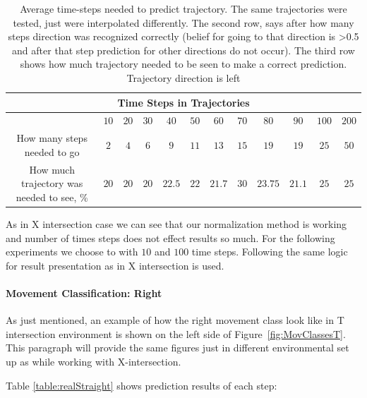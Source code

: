 \begin{table}[h!]
	\centering
	\begin{tabular}{|c|c|c|c|c|c|c|c|c|c|c|c|} 
		\hline
		\multicolumn{12}{|c|}{Time Steps in Trajectories} \\
		\hline
		& $10$ & $20$ & $30$ & $40$ & $50$ & $60$ & $70$ & $80$ & $90$ & $100$ & $200$ \\ [0.5ex] 
		\hline\hline
		How many steps needed to go               & $2$  & $4$  & $6$  & $9$     & $11$ & $13$  &  $15$   & $19$     & $19$   & $25$ & $50$ \\ [1ex]
		How much trajectory was needed to see, \% & $20$ & $20$ & $20$ & $22.5$  & $22$ & $21.7$ & $30$ & $23.75$  & $21.1$ & $25$ & $25$ \\ [1ex]
		\hline
	\end{tabular}
	\caption{Average time-steps needed to predict trajectory. The same trajectories were tested, just were interpolated differently. The second row, says after how many steps direction was recognized correctly (belief for going to that direction is >0.5 and after that step prediction for other directions do not occur). The third row shows how much trajectory needed to be seen to make a correct prediction. Trajectory direction is left}
	\label{table:CompareLeftT}
\end{table}

As in X intersection case we can see that our normalization method is working and number of times steps does not effect results so much. For the following experiments we choose to with $10$ and $100$ time steps. Following the same logic for result presentation as in X intersection is used.

\paragraph{Movement Classification: Right}

As just mentioned, an example of how the right movement class look like in T intersection environment is shown on the left side of Figure~\ref{fig:MovClassesT}. \\
This paragraph will provide the same figures just in different environmental set up as while working with X-intersection.

Table \ref{table:realStraight} shows prediction results of each step:

